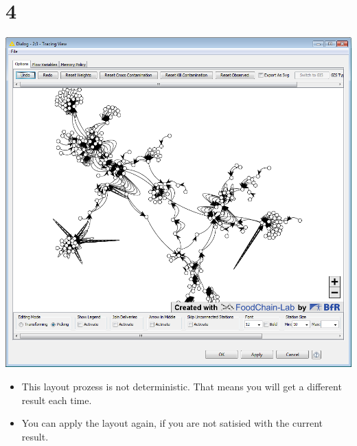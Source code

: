 \documentclass{beamer}
\begin{document}
\section{4}
\begin{frame}
	\begin{center}
  		\includegraphics[height=0.6\textheight]{4.png}
	\end{center}
	\begin{itemize}
		\item This layout prozess is not deterministic. That means you will get a different result each time.
		\item You can apply the layout again, if you are not satisied with the current result.
	\end{itemize}
\end{frame}
\end{document}
